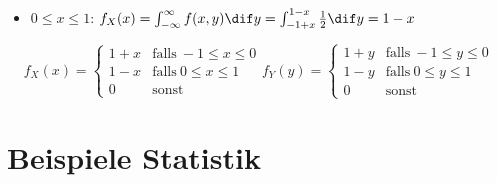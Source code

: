 \begin{example}
\begin{itemize}
		\item $0 \leq x \leq 1$: $f_X(x) = \int_{-\infty}^{\infty} f(x,y) \dif y = \int_{-1+x}^{1-x} \frac{1}{2} \dif y = 1 - x$
	\end{itemize}
	\begin{equation*}
		f_X(x) =
		\begin{cases}
			1 + x & \text{falls} ~-1 \leq x \leq 0\\
			1 - x & \text{falls} ~0 \leq x \leq 1\\
			0 & \text{sonst}
		\end{cases}
		f_Y(y) =
		\begin{cases}
			1 + y & \text{falls} ~-1 \leq y \leq 0\\
			1 - y & \text{falls} ~0 \leq y \leq 1\\
			0 & \text{sonst}
		\end{cases}
	\end{equation*}
\end{example}

\section*{Beispiele Statistik}%
\label{sec:beispiele_statistik}

